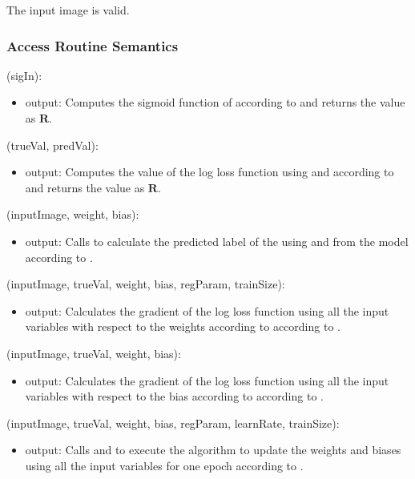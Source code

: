 \documentclass[12pt, titlepage]{article}
\begin{document}
The input image is valid.

\subsubsection{Access Routine Semantics}

\noindent {}(sigIn):
\begin{itemize}
\item output: Computes the sigmoid function of  according to 
and returns the value  as $\mathbf{R}$.
\end{itemize}

\noindent {}(trueVal, predVal):
\begin{itemize}
\item output: Computes the value of the log loss function using  and 
according to  and returns the value  as $\mathbf{R}$.
\end{itemize}

\noindent {}(inputImage, weight, bias):
\begin{itemize}
\item output: Calls  to calculate the predicted label of the 
using  and  from the model according to .
\end{itemize}

\noindent {}(inputImage, trueVal, weight, bias, regParam, trainSize):
\begin{itemize}
\item output: Calculates the gradient of the log loss function using all the input variables
with respect to the weights according to according to .
\end{itemize}

\noindent {}(inputImage, trueVal, weight, bias):
\begin{itemize}
  \item output: Calculates the gradient of the log loss function using all the input variables
  with respect to the bias according to according to .
\end{itemize}

\noindent {}(inputImage, trueVal, weight, bias, regParam, learnRate, trainSize):
\begin{itemize}
\item output: Calls  and  to
execute the algorithm to update the weights and biases using all the input variables 
for one epoch according to .
\end{itemize}
\end{document}
